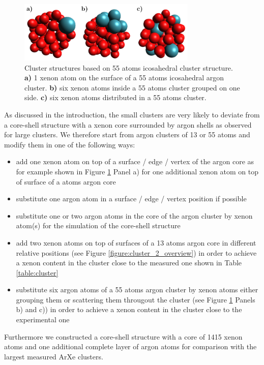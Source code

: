 \begin{figure}[h]
 \centering
 \includegraphics[width=8.5cm]{pics/cluster_3_overview.pdf}
 \caption{Cluster structures based on 55 atoms icosahedral cluster structure.
          \textbf{a)} 1 xenon atom on the surface of a 55 atoms icosahedral
          argon cluster. \textbf{b)} six xenon atoms inside a 55 atoms cluster
          grouped on one side. \textbf{c)} six xenon atoms distributed
          in a 55 atoms cluster. }
 \label{figure:cluster_3_overview}
\end{figure}

As discussed in the introduction, the small clusters are very likely
to deviate from a core-shell structure with a xenon core surrounded
by argon shells as observed for large clusters. We therefore start from
argon clusters of 13 or 55 atoms and modify them in one of the following
ways:

\begin{itemize}
 \item add one xenon atom on top of a surface / edge / vertex of
       the argon core as for example shown in
       Figure \ref{figure:cluster_3_overview} Panel a)
       for one additional xenon atom
       on top of surface of a \unit[55]{atoms} argon core
 \item substitute one argon atom in a surface / edge / vertex position if
       possible
 \item substitute one or two argon atoms in the core of the argon cluster
       by xenon atom(s) for the simulation of the core-shell structure
 \item add two xenon atoms on top of surfaces of a 13 atoms argon core
       in different relative positions (see Figure
       \ref{figure:cluster_2_overview})
       in order to achieve a xenon content in the cluster close to the
       measured one shown in Table \ref{table:cluster}
 \item substitute six argon atoms of a 55 atoms argon cluster by xenon
       atoms either grouping them or scattering them througout the cluster
       (see Figure \ref{figure:cluster_3_overview} Panels b) and c)) in order to
       achieve a xenon content in the cluster close to the experimental one
\end{itemize}

Furthermore we constructed a core-shell structure with a core of
1415 xenon atoms and one additional complete layer of argon atoms for
comparison with the largest measured ArXe clusters.


